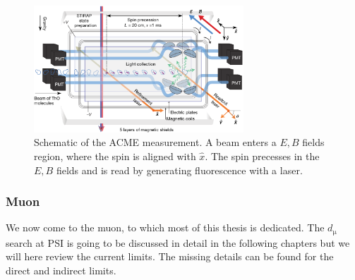 \begin{refsection}
            \begin{figure}
                \centering
                \includegraphics[width = 0.7\textwidth]{Figures/Introduction/eEDM_ACME.png}
                \caption[EDM: ACME experiment]{Schematic of the ACME measurement. A   beam enters a $E,B$ fields region, where the spin is aligned with $\hat{x}$.
                The spin precesses in the $E,B$ fields and is read by generating fluorescence with a laser.}
                \label{fig:ACME}
            \end{figure}
        
        \subsubsection{Muon}
            We now come to the muon, to which most of this thesis is dedicated. The $d_\upmu$ search at PSI is going to be discussed in detail in the following chapters but we will here review the current limits. 
            The missing details can be found for the direct \cite{muEDM:direct} and indirect \cite{muEDM:indirect} limits.
            

\end{refsection}
